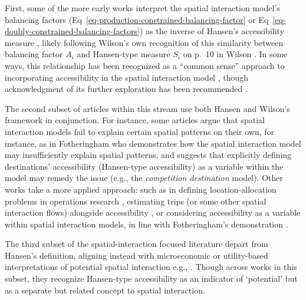 \documentclass[
  10pt,
  letterpaper,
]{article}
\begin{document}
First, some of the more early works interpret the spatial interaction
model's balancing factors
(Eq~\ref{eq-production-constrained-balancing-factor} or
Eq~\ref{eq-doubly-constrained-balancing-factors}) as the inverse of
Hansen's accessibility measure
\citep{harrisEquilibriumValuesDynamics1978, leonardiOptimumFacilityLocation1978, fotheringhamSPATIALSTRUCTUREDISTANCE1981, fotheringhamSpatialCompetitionAgglomeration1985},
likely following Wilson's own recognition of this similarity between
balancing factor \(A_i\) and Hansen-type measure \(S_i\) on p.~10 in
Wilson \citep{wilson1971}. In some ways, this relationship has been
recognized as a ``common sense'' approach to incorporating accessibility
in the spatial interaction model
\citep[p.~99]{morrisAccessibilityIndicatorsTransport1979}, though
acknowledgment of its further exploration has been recommended
\citep{battyMethodResiduesUrban1976}.

The second subset of articles within this stream use both Hansen
\citep{hansen1959} and Wilson's \citep{wilson1971} framework in
conjunction. For instance, some articles argue that spatial interaction
models fail to explain certain spatial patterns on their own, for
instance, as in Fotheringham
\citep{fotheringhamSpatialCompetitionAgglomeration1985} who demonstrates
how the spatial interaction model may insufficiently explain spatial
patterns, and suggests that explicitly defining destinations'
accessibility (Hansen-type accessibility) as a variable within the model
may remedy the issue (e.g., the \emph{competition destination} model).
Other works take a more applied approach: such as in defining
location-allocation problems in operations research
\citep{leonardiOptimumFacilityLocation1978, beaumontLocationallocationProblemsPlane1981},
estimating trips (or some other spatial interaction flows) alongside
accessibility
\citep[e.g.,][]{clarke2002deriving, grengs2004measuring, turk2019socio},
or considering accessibility as a variable within spatial interaction
models, in line with Fotheringham's
\citep{fotheringhamSpatialCompetitionAgglomeration1985} demonstration
\citep[e.g.,][]{beckers2022incorporating}.

The third subset of the spatial-interaction focused literature depart
from Hansen's \citep{hansen1959} definition, aligning instead with
microeconomic or utility-based interpretations of potential spatial
interaction e.g.,
\citep{morrisAccessibilityIndicatorsTransport1979, leonardiRandomUtilityDemand1984}.
Though across works in this subset, they recognize Hansen-type
accessibility as an indicator of `potential' but as a separate but
related concept to spatial interaction.
\end{document}
